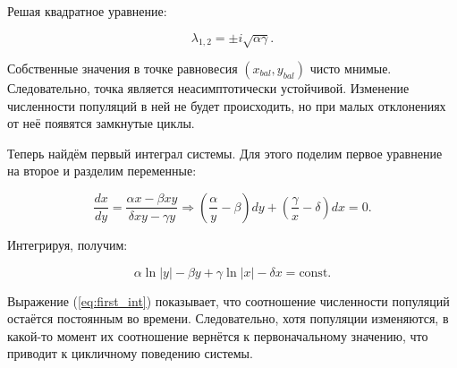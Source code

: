 Решая квадратное уравнение:

\begin{equation}
	\lambda_{1,2} = \pm i \sqrt{\alpha\gamma}.
\end{equation}

Собственные значения в точке равновесия $(x_{bal}, y_{bal})$ чисто мнимые.
Следовательно, точка является неасимптотически устойчивой. Изменение численности популяций в ней не будет происходить, но при малых отклонениях от неё появятся замкнутые циклы.

Теперь найдём первый интеграл системы. Для этого поделим первое уравнение на второе и разделим переменные:

\begin{equation} \frac{dx}{dy} = \frac{\alpha x - \beta x y}{\delta x y - \gamma y} \Rightarrow \left(\frac{\alpha}{y} - \beta\right) dy + \left(\frac{\gamma}{x} - \delta\right)dx = 0. \label{eq:diff_FI} \end{equation}

Интегрируя, получим:

\begin{equation} \alpha \ln |y| - \beta y + \gamma \ln |x| - \delta x = \text{const}. \label{eq:first_int} \end{equation}

Выражение (\ref{eq:first_int}) показывает, что соотношение численности популяций остаётся постоянным во времени.
Следовательно, хотя популяции изменяются, в какой-то момент их соотношение вернётся к первоначальному значению, что приводит к цикличному поведению системы.